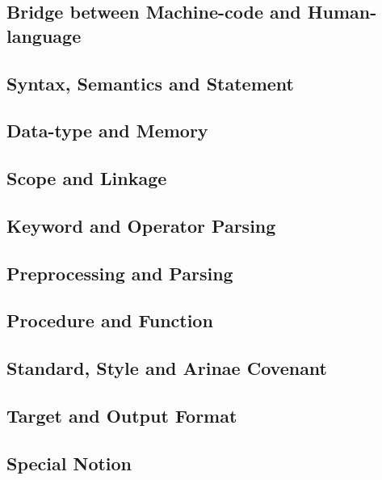 
\subsection{Bridge between Machine-code and Human-language}


\subsection{Syntax, Semantics and Statement}


\subsection{Data-type and Memory}


\subsection{Scope and Linkage}


\subsection{Keyword and Operator Parsing}




\subsection{Preprocessing and Parsing}


\subsection{Procedure and Function}


\subsection{Standard, Style and Arinae Covenant}


\subsection{Target and Output Format}


\subsection{Special Notion}

